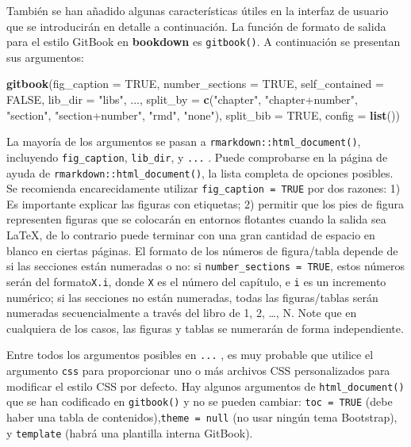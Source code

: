 \documentclass[12pt,]{krantz}
\makeatletter
\newenvironment{Shaded}{\begin{snugshade}}{\end{snugshade}}
\newcommand{\KeywordTok}[1]{\textcolor[rgb]{0.13,0.29,0.53}{\textbf{{#1}}}}
\newcommand{\DataTypeTok}[1]{\textcolor[rgb]{0.13,0.29,0.53}{{#1}}}
\newcommand{\StringTok}[1]{\textcolor[rgb]{0.31,0.60,0.02}{{#1}}}
\newcommand{\OtherTok}[1]{\textcolor[rgb]{0.56,0.35,0.01}{{#1}}}
\newcommand{\NormalTok}[1]{{#1}}
\newenvironment{kframe}{%
\medskip{}
\setlength{\fboxsep}{.8em}
 \def\at@end@of@kframe{}%
 \ifinner\ifhmode%
  \def\at@end@of@kframe{\end{minipage}}%
  \begin{minipage}{\columnwidth}%
 \fi\fi%
 \def\FrameCommand##1{\hskip\@totalleftmargin \hskip-\fboxsep
 \colorbox{shadecolor}{##1}\hskip-\fboxsep
     \hskip-\linewidth \hskip-\@totalleftmargin \hskip\columnwidth}%
 \MakeFramed {\advance\hsize-\width
   \@totalleftmargin\z@ \linewidth\hsize
   \@setminipage}}%
 {\par\unskip\endMakeFramed%
 \at@end@of@kframe}
\renewenvironment{Shaded}{\begin{kframe}}{\end{kframe}}
\theoremstyle{definition}
\theoremstyle{definition}
\theoremstyle{remark}
\makeatother
\begin{document}
También se han añadido algunas características útiles en la interfaz de
usuario que se introducirán en detalle a continuación. La función de
formato de salida para el estilo GitBook en \textbf{bookdown} es
\texttt{gitbook()}. A continuación se presentan sus argumentos:

\begin{Shaded}
\begin{Highlighting}[]
\KeywordTok{gitbook}\NormalTok{(}\DataTypeTok{fig_caption =} \OtherTok{TRUE}\NormalTok{, }\DataTypeTok{number_sections =} \OtherTok{TRUE}\NormalTok{, }\DataTypeTok{self_contained =} \OtherTok{FALSE}\NormalTok{, }
  \DataTypeTok{lib_dir =} \StringTok{"libs"}\NormalTok{, ..., }\DataTypeTok{split_by =} \KeywordTok{c}\NormalTok{(}\StringTok{"chapter"}\NormalTok{, }\StringTok{"chapter+number"}\NormalTok{, }
    \StringTok{"section"}\NormalTok{, }\StringTok{"section+number"}\NormalTok{, }\StringTok{"rmd"}\NormalTok{, }\StringTok{"none"}\NormalTok{), }\DataTypeTok{split_bib =} \OtherTok{TRUE}\NormalTok{, }
  \DataTypeTok{config =} \KeywordTok{list}\NormalTok{())}
\end{Highlighting}
\end{Shaded}

La mayoría de los argumentos se pasan a
\texttt{rmarkdown::html\_document()}, incluyendo \texttt{fig\_caption},
\texttt{lib\_dir}, y \texttt{...} . Puede comprobarse en la página de
ayuda de \texttt{rmarkdown::html\_document()}, la lista completa de
opciones posibles. Se recomienda encarecidamente utilizar
\texttt{fig\_caption\ =\ TRUE} por dos razones: 1) Es importante
explicar las figuras con etiquetas; 2) permitir que los pies de figura
representen figuras que se colocarán en entornos flotantes cuando la
salida sea LaTeX, de lo contrario puede terminar con una gran cantidad
de espacio en blanco en ciertas páginas. El formato de los números de
figura/tabla depende de si las secciones están numeradas o no: si
\texttt{number\_sections\ =\ TRUE}, estos números serán del
formato\texttt{X.i}, donde \texttt{X} es el número del capítulo, e
\texttt{i} es un incremento numérico; si las secciones no están
numeradas, todas las figuras/tablas serán numeradas secuencialmente a
través del libro de 1, 2, \ldots{}, N. Note que en cualquiera de los
casos, las figuras y tablas se numerarán de forma independiente.

Entre todos los argumentos posibles en \texttt{...} , es muy probable
que utilice el argumento \texttt{css} para proporcionar uno o más
archivos CSS personalizados para modificar el estilo CSS por defecto.
Hay algunos argumentos de \texttt{html\_document()} que se han
codificado en \texttt{gitbook()} y no se pueden cambiar:
\texttt{toc\ =\ TRUE} (debe haber una tabla de
contenidos),\texttt{theme\ =\ null} (no usar ningún tema Bootstrap), y
\texttt{template} (habrá una plantilla interna GitBook).
\end{document}
